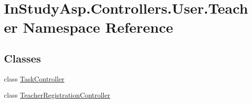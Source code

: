 \hypertarget{namespace_in_study_asp_1_1_controllers_1_1_user_1_1_teacher}{}\section{In\+Study\+Asp.\+Controllers.\+User.\+Teacher Namespace Reference}
\label{namespace_in_study_asp_1_1_controllers_1_1_user_1_1_teacher}
\subsection*{Classes}
\begin{DoxyCompactItemize}
\item 
class \hyperlink{class_in_study_asp_1_1_controllers_1_1_user_1_1_teacher_1_1_task_controller}{Task\+Controller}
\item 
class \hyperlink{class_in_study_asp_1_1_controllers_1_1_user_1_1_teacher_1_1_teacher_registration_controller}{Teacher\+Registration\+Controller}
\end{DoxyCompactItemize}
